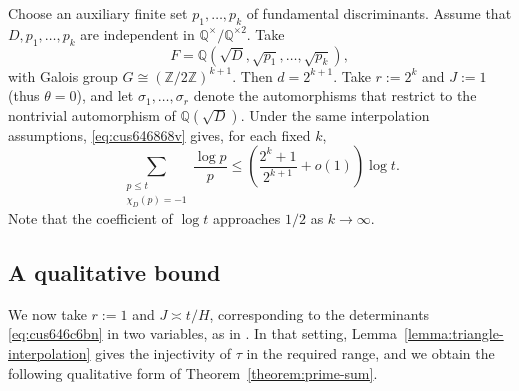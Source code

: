 \documentclass[reqno]{amsart} 
\begin{document}
\begin{example}\label{example:cus65oadaz}
  Choose an auxiliary finite set $p_1, \dotsc, p_k$ of fundamental discriminants.  Assume that $D, p_1, \dotsc, p_k$ are independent in $\mathbb{Q}^{\times} / \mathbb{Q}^{\times 2}$.  Take
  \begin{equation*}
    F = \mathbb{Q}(\sqrt{D}, \sqrt{p_1}, \dotsc, \sqrt{p_k}),
  \end{equation*}
  with Galois group $G \cong(\mathbb{Z} / 2 \mathbb{Z})^{k + 1}$.  Then $d = 2^{k + 1}$.  Take $r := 2^{k}$ and $J := 1$ (thus $\theta = 0$), and let $\sigma_1, \dotsc, \sigma_r$ denote the automorphisms that restrict to the nontrivial automorphism of $\mathbb{Q}(\sqrt{D})$.  Under the same interpolation assumptions, \eqref{eq:cus646868v} gives, for each fixed $k$,
  \begin{equation*}
    \sum_{
      \substack{
        p \leq t  \\
        \chi_D(p) = - 1        
      }
    }
    \frac{\log p}{p}
    \leq \left( \frac{2^k + 1}{2^{k+1}} + o(1) \right) \log t.
  \end{equation*}
  Note that the coefficient of $\log t$ approaches $1/2$ as $k \to \infty$.
\end{example}

\subsection{A qualitative bound}\label{section:qualitative}

We now take $r:=1$ and $J\asymp t/H$, corresponding to the determinants \eqref{eq:cus646c6bn} in two variables, as in \cite{hexagon:2610.00311v2}.  In that setting, Lemma~\ref{lemma:triangle-interpolation} gives the injectivity of $\tau$ in the required range, and we obtain the following qualitative form of Theorem~\ref{theorem:prime-sum}.
\end{document}
